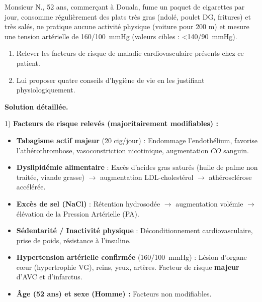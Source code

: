\documentclass[11pt]{article}
\begin{document}
\begin{exoresolu}
Monsieur N., 52 ans, commerçant à Douala, fume un paquet de cigarettes par jour, consomme régulièrement des plats très gras (ndolé, poulet DG, fritures) et très salés, ne pratique aucune activité physique (voiture pour 200 m) et mesure une tension artérielle de \SI{160/100}{mmHg} (valeurs cibles : \textless \SI{140/90}{mmHg}).
\begin{enumerate}
\item Relever les facteurs de risque de maladie cardiovasculaire présents chez ce patient.
\item Lui proposer quatre conseils d'hygiène de vie en les justifiant physiologiquement.
\end{enumerate}
\tcblower
\textbf{Solution détaillée.}

1) \textbf{Facteurs de risque relevés (majoritairement modifiables) :}
\begin{itemize}
\item \textbf{Tabagisme actif majeur} (20 cig/jour) : Endommage l'endothélium, favorise l'athérothrombose, vasoconstriction nicotinique, augmentation $CO$ sanguin.
\item \textbf{Dyslipidémie alimentaire} : Excès d'acides gras saturés (huile de palme non traitée, viande grasse) $\rightarrow$ augmentation LDL-cholestérol $\rightarrow$ athérosclérose accélérée.
\item \textbf{Excès de sel (NaCl)} : Rétention hydrosodée $\rightarrow$ augmentation volémie $\rightarrow$ élévation de la Pression Artérielle (PA).
\item \textbf{Sédentarité / Inactivité physique} : Déconditionnement cardiovasculaire, prise de poids, résistance à l'insuline.
\item \textbf{Hypertension artérielle confirmée} (\SI{160/100}{mmHg}) : Lésion d'organe cœur (hypertrophie VG), reins, yeux, artères. Facteur de risque \textbf{majeur} d'AVC et d'infarctus.
\item \textbf{Âge (52 ans) et sexe (Homme) :} Facteurs non modifiables.
\end{itemize}


\end{exoresolu}
\end{document}
